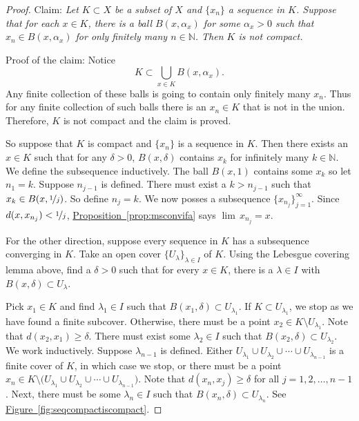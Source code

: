 \documentclass[12pt,openany]{book}
\newcommand{\N}{{\mathbb{N}}}
\theoremstyle{plain}
\theoremstyle{remark}
\theoremstyle{definition}
\theoremstyle{exercise}
\theoremstyle{example}
\newcommand{\figureref}[1]{\hyperref[#1]{Figure~\ref*{#1}}}
\newcommand{\propref}[1]{\hyperref[#1]{Proposition~\ref*{#1}}}
\begin{document}
\begin{proof}
Claim: \emph{Let $K \subset X$ be a subset of $X$ and
$\{ x_n \}$ a sequence in $K$.  Suppose that for each $x \in K$,
there is a ball $B(x,\alpha_x)$ for some $\alpha_x > 0$ such that
$x_n \in B(x,\alpha_x)$ for only finitely many $n \in \N$.
Then $K$ is not compact.}

Proof of the claim:
Notice
\begin{equation*}
K \subset \bigcup_{x \in K} B(x,\alpha_x) .
\end{equation*}
Any finite collection of these balls is going to contain only finitely many
$x_n$.  Thus for any finite collection of such balls there is an $x_n \in K$
that is not in the union.  Therefore, $K$ is not compact and the claim is
proved.

So suppose that $K$ is compact and $\{ x_n \}$ is a sequence in $K$.
Then there exists an $x \in K$ such that
for any $\delta > 0$,
$B(x,\delta)$ contains $x_k$ for infinitely many $k \in \N$.
We define the subsequence inductively.
The ball $B(x,1)$ contains some $x_k$ so let $n_1 = k$.
Suppose $n_{j-1}$ is defined.
There must exist a $k > n_{j-1}$
such that $x_k \in B(x,\nicefrac{1}{j})$.  So define
$n_j = k$.
We now posses a subsequence $\{ x_{n_j} \}_{j=1}^\infty$.
Since
$d(x,x_{n_j}) < \nicefrac{1}{j}$,  \propref{prop:msconvifa} says
$\lim\, x_{n_j} = x$.

For the other direction, suppose every sequence in $K$
has a 
subsequence converging in $K$.
Take
an open cover $\{ U_\lambda \}_{\lambda \in I}$ of $K$.
Using the Lebesgue covering lemma above, find a $\delta > 0$
such that for every $x \in K$, there is a $\lambda \in I$ with
$B(x,\delta) \subset U_\lambda$.

Pick $x_1 \in K$ and find $\lambda_1 \in I$ such that $B(x_1,\delta) \subset
U_{\lambda_1}$.
If $K \subset U_{\lambda_1}$, we stop as we have found a
finite subcover.
Otherwise, there must be
a point $x_2 \in K \setminus U_{\lambda_1}$.
Note that $d(x_2,x_1) \geq \delta$.
There must exist some $\lambda_2 \in I$ such that
$B(x_2,\delta) \subset U_{\lambda_2}$.
We work inductively.  Suppose $\lambda_{n-1}$ is defined.
Either
$U_{\lambda_1} \cup
U_{\lambda_2} \cup \cdots \cup
U_{\lambda_{n-1}}$ is a finite cover of $K$, in which case we
stop, or
there must be 
a point $x_n \in K \setminus \bigl( U_{\lambda_1} \cup
U_{\lambda_2} \cup \cdots \cup
U_{\lambda_{n-1}}\bigr)$.
Note that $d(x_n,x_j) \geq \delta$ for all $j = 1,2,\ldots,n-1$.
Next, there must be some $\lambda_n \in I$
such that $B(x_n,\delta) \subset U_{\lambda_n}$.
See \figureref{fig:seqcompactiscompact}.


\end{proof}
\end{document}
